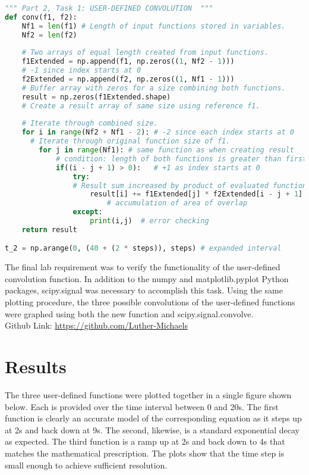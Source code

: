 \documentclass[12pt]{report}
\begin{document}
\begin{lstlisting}[language=Python]
""" Part 2, Task 1: USER-DEFINED CONVOLUTION  """
def conv(f1, f2):
	Nf1 = len(f1) # Length of input functions stored in variables.
	Nf2 = len(f2)
	
	# Two arrays of equal length created from input functions.
	f1Extended = np.append(f1, np.zeros((1, Nf2 - 1)))  
	# -1 since index starts at 0
	f2Extended = np.append(f2, np.zeros((1, Nf1 - 1)))  
	# Buffer array with zeros for a size combining both functions.
	result = np.zeros(f1Extended.shape) 
	# Create a result array of same size using reference f1.
	   
	# Iterate through combined size.
	for i in range(Nf2 + Nf1 - 2): # -2 since each index starts at 0
	  # Iterate through original function size of f1.
		for j in range(Nf1): # same function as when creating result
			# condition: length of both functions is greater than first
			if((i - j + 1) > 0):   # +1 as index starts at 0
				try:
			  	# Result sum increased by product of evaluated functions.
					result[i] += f1Extended[j] * f2Extended[i - j + 1]
			  			# accumulation of area of overlap
				except:       
					print(i,j)  # error checking
	return result

t_2 = np.arange(0, (40 + (2 * steps)), steps) # expanded interval
\end{lstlisting}

The final lab requirement was to verify the functionality of the user-defined convolution function. In addition to the numpy and matplotlib.pyplot Python packages, scipy.signal was necessary to accomplish this task. Using the same plotting procedure, the three possible convolutions of the user-defined functions were graphed using both the new function and scipy.signal.convolve. \\

Github Link: \url{https://github.com/Luther-Michaels}
	
\section{Results}

The three user-defined functions were plotted together in a single figure shown below. Each is provided over the time interval between 0 and 20s. The first function is clearly an accurate model of the corresponding equation as it steps up at 2s and back down at 9s. The second, likewise, is a standard exponential decay as expected. The third function is a ramp up at 2s and back down to 4s that matches the mathematical prescription. The plots show that the time step is small enough to achieve sufficient resolution. \\
	
\end{document}
